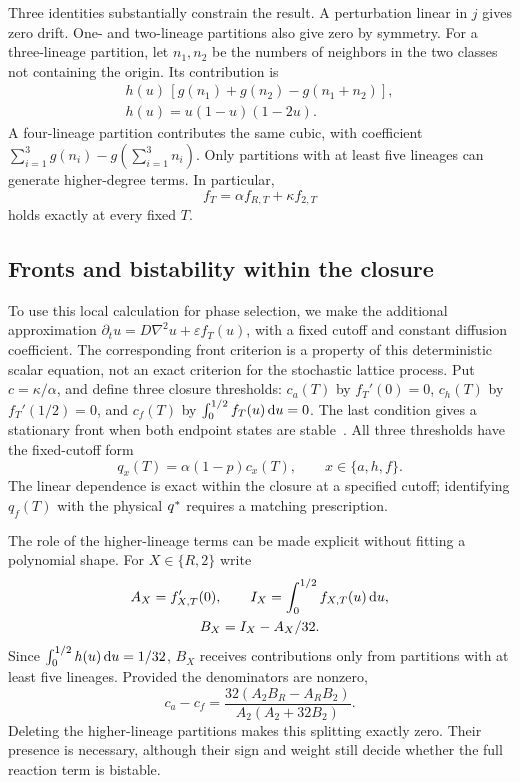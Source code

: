 Three identities substantially constrain the result. A perturbation linear in
$j$ gives zero drift. One- and two-lineage partitions also give zero by symmetry.
For a three-lineage partition, let $n_1,n_2$ be the numbers of neighbors in the
two classes not containing the origin. Its contribution is
\begin{equation}
 \begin{gathered}
 h(u)\,[g(n_1)+g(n_2)-g(n_1+n_2)],\\
 h(u)=u(1-u)(1-2u).
 \end{gathered}
 \label{eq:three}
\end{equation}
A four-lineage partition contributes the same cubic, with coefficient
$\sum_{i=1}^3g(n_i)-g(\sum_{i=1}^3 n_i)$.
Only partitions with at least five lineages can generate higher-degree terms.
In particular,
\begin{equation}
 f_T=\alpha f_{R,T}+\kappa f_{2,T}
 \label{eq:linearclosure}
\end{equation}
holds exactly at every fixed $T$.

\subsection{Fronts and bistability within the closure}

To use this local calculation for phase selection, we make the additional
approximation
$\partial_tu=D\nabla^2u+\varepsilon f_T(u)$, with a fixed cutoff and constant
diffusion coefficient. The corresponding front criterion is a property of this
deterministic scalar equation, not an exact criterion for the stochastic lattice
process. Put $c=\kappa/\alpha$, and define three closure thresholds:
$c_a(T)$ by $f_T'(0)=0$, $c_h(T)$ by $f_T'(1/2)=0$, and $c_f(T)$ by
$\int_0^{1/2}f_T(u)\,\mathrm{d} u=0$. The last condition gives a stationary front when
both endpoint states are stable~\cite{durrett1994b,durrett2009}. All three
thresholds have the fixed-cutoff form
\begin{equation}
 q_x(T)=\alpha(1-p)c_x(T),\qquad x\in\{a,h,f\}.
 \label{eq:line}
\end{equation}
The linear dependence is exact within the closure at a specified cutoff;
identifying $q_f(T)$ with the physical $q^{*}$ requires a matching prescription.

The role of the higher-lineage terms can be made explicit without fitting a
polynomial shape. For $X\in\{R,2\}$ write
\[
 \begin{gathered}
 A_X=f_{X,T}'(0),\qquad
 I_X=\int_0^{1/2}f_{X,T}(u)\,\mathrm{d} u,\\
 B_X=I_X-A_X/32.
 \end{gathered}
\]
Since $\int_0^{1/2}h(u)\,\mathrm{d} u=1/32$, $B_X$ receives contributions only from
partitions with at least five lineages. Provided the denominators are nonzero,
\begin{equation}
 c_a-c_f=
 \frac{32(A_2B_R-A_RB_2)}{A_2(A_2+32B_2)}.
 \label{eq:lineagesplitting}
\end{equation}
Deleting the higher-lineage partitions makes this splitting exactly zero.
Their presence is necessary, although their sign and weight still decide whether
the full reaction term is bistable.


